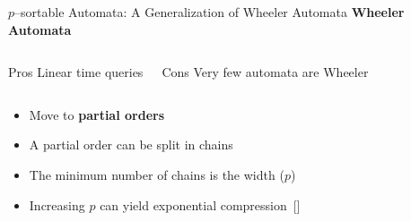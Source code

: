 \documentclass[aspectratio=169]{beamer}
\begin{document}
\begin{frame}{$p$--sortable Automata: A Generalization of Wheeler Automata}
	\textcolor{oiBlue}{\textbf{Wheeler Automata}}
	\begin{columns}[c]
		\begin{greenblock}{Pros}
			Linear time queries
		\end{greenblock}

		\begin{block}{Cons}
			Very few automata are Wheeler
		\end{block}

	\end{columns}

	\vspace{0.5cm}
	\begin{itemize}
		\item Move to \textbf{partial orders}
		\item A partial order can be split in chains
		\item The minimum number of chains is the width ($p$)
	\end{itemize}
	\begin{itemize}
		\item Increasing $p$ can yield exponential compression~[\cite{manziniRationalConstructionWheeler2024}]
	\end{itemize}
\end{frame}

\end{document}
